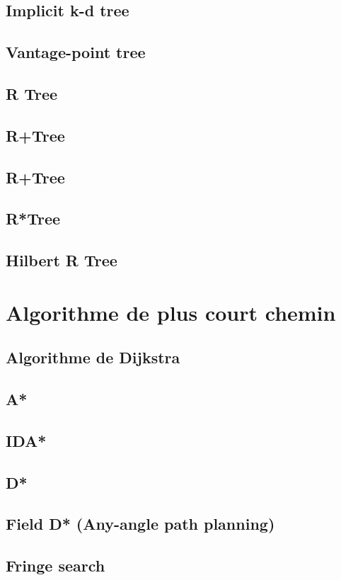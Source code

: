 \subsection{Implicit k-d tree}
\subsection{Vantage-point tree}
\subsection{R Tree}
\subsection{R+Tree}
\subsection{R+Tree}
\subsection{R*Tree}
\subsection{Hilbert R Tree}

%
\section{Algorithme de plus court chemin}
\subsection{Algorithme de Dijkstra}
\subsection{A*}
\subsection{IDA*}
\subsection{D*}
\subsection{Field D* (Any-angle path planning)}
\subsection{Fringe search}
